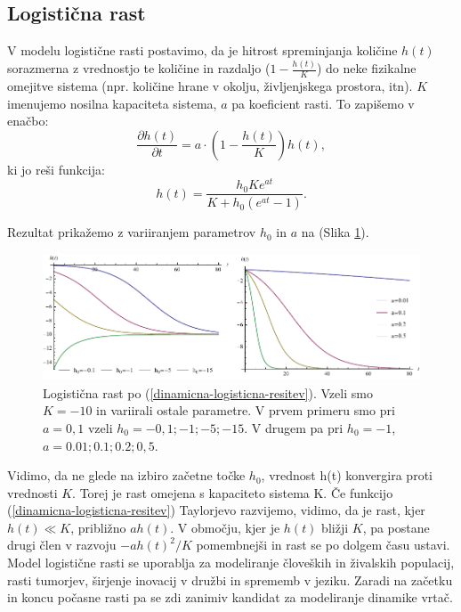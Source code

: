\documentclass[a4paper, twoside, 12pt]{book}
\begin{document}
\subsection{Logistična rast}

V modelu logistične rasti postavimo, da je hitrost spreminjanja količine $h(t)$ sorazmerna z vrednostjo te količine in razdaljo ($1 - \frac{h(t)}{K}$) do neke fizikalne omejitve sistema (npr. količine hrane v okolju, življenjskega prostora, itn). $K$ imenujemo nosilna kapaciteta sistema, $a$ pa koeficient rasti. To zapišemo v enačbo:
    \begin{equation}
      \frac{\partial h(t)}{\partial t} = a \cdot \left( 1 - \frac{h(t)}{K} \right) h(t),
      \label{dinamicna-logisticna}
    \end{equation}
ki jo reši funkcija:
    \begin{equation}
      h(t) = \frac{h_0 K e^{a t}}{K + h_0 (e^{a t}-1)}.
      \label{dinamicna-logisticna-resitev}
    \end{equation}

Rezultat prikažemo z variiranjem parametrov $h_0$ in $a$ na (Slika \ref{fig:logisticna-rast}).
    \begin{figure}[h]
      \begin{center}
        \includegraphics[width=14cm]{slike/logisticna-rast}
      \end{center}
      \caption{Logistična rast po (\ref{dinamicna-logisticna-resitev}). Vzeli smo $K=-10$ in variirali ostale parametre. V prvem primeru smo pri $a=0,1$ vzeli $h_0=-0,1;-1;-5;-15$. V drugem pa pri $h_0=-1$, $a=0.01;0.1;0.2;0,5$.}
      \label{fig:logisticna-rast}
    \end{figure}

    Vidimo, da ne glede na izbiro začetne točke $h_0$, vrednost h(t) konvergira proti vrednosti $K$. Torej je rast omejena s kapaciteto sistema K.
    Če funkcijo (\ref{dinamicna-logisticna-resitev}) Taylorjevo razvijemo, vidimo, da je rast, kjer $h(t) \ll K$, približno $a h(t)$. V območju, kjer je $h(t)$ bližji $K$, pa postane drugi člen v razvoju $-a h(t)^2 / K$ pomembnejši in rast se po dolgem času ustavi.\\
    Model logistične rasti se uporablja za modeliranje človeških in živalskih populacij, rasti tumorjev, širjenje inovacij v družbi in sprememb v jeziku. Zaradi na začetku in koncu počasne rasti pa se zdi zanimiv kandidat za modeliranje dinamike vrtač.
\end{document}
